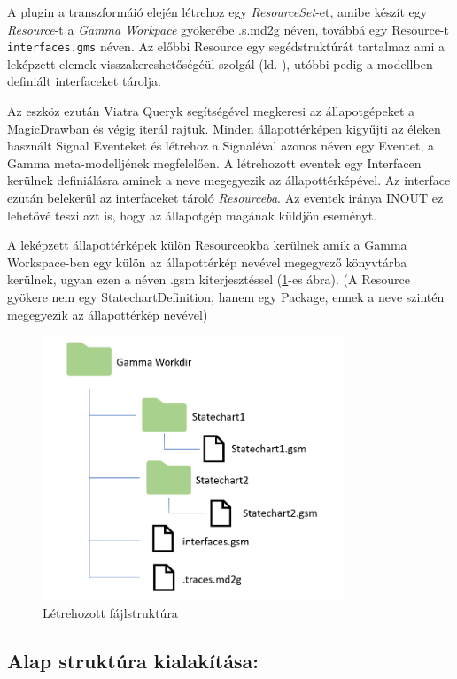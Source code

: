 A plugin a transzformáió elején létrehoz egy \emph{ResourceSet}-et, amibe készít egy \emph{Resource}-t a \emph{Gamma Workpace} gyökerébe .s.md2g néven, továbbá egy Resource-t \verb+interfaces.gms+ néven. Az előbbi Resource egy segédstruktúrát tartalmaz ami a leképzett elemek visszakereshetőségéül szolgál (ld. ), utóbbi pedig a modellben definiált interfaceket tárolja.

Az eszköz ezután Viatra Queryk segítségével megkeresi az állapotgépeket a MagicDrawban és végig iterál rajtuk. Minden állapottérképen kigyűjti az éleken használt Signal Eventeket és létrehoz a Signaléval azonos néven egy Eventet, a Gamma meta-modelljének megfelelően. A létrehozott eventek egy Interfacen kerülnek definiálásra aminek a neve megegyezik az állapottérképével. Az interface ezután belekerül az interfaceket tároló \emph{Resourceba}. Az eventek iránya INOUT ez lehetővé teszi azt is, hogy az állapotgép magának küldjön eseményt.

A leképzett állapottérképek külön Resourceokba kerülnek amik a Gamma Workspace-ben egy külön az állapottérkép nevével megegyező könyvtárba kerülnek, ugyan ezen a néven .gsm kiterjesztéssel (\ref{fig:filestructure}-es ábra). (A Resource gyökere nem egy StatechartDefinition, hanem egy Package, ennek a neve szintén megegyezik az állapottérkép nevével)

\begin{figure}[H]
	\centering
	\includegraphics[keepaspectratio, width=90mm]{figures/filestructure.png}
	\caption{Létrehozott fájlstruktúra}
	\label{fig:filestructure}
\end{figure}

\subsection{Alap struktúra kialakítása:}

